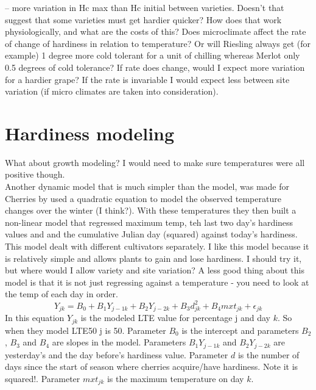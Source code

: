 \documentclass[11pt,letter]{article}
\begin{document}
\cite{Ferguson2014} – more variation in Hc max than Hc initial between varieties. Doesn't that suggest that some varieties must get hardier quicker? How does that work physiologically, and what are the costs of this? Does microclimate affect the rate of change of hardiness in relation to temperature? Or will Riesling always get (for example) 1 degree more cold tolerant for a unit of chilling whereas Merlot only 0.5 degrees of cold tolerance? If rate does change, would I expect more variation for a hardier grape? If the rate is invariable I would expect less between site variation (if micro climates are taken into consideration). \\

\section{Hardiness modeling}

What about growth modeling? I would need to make sure temperatures were all positive though. \\

Another dynamic model that is much simpler than the \cite{Ferguson2011} model, was made for Cherries by \cite{Salazar-Gutierrez2020} used a quadratic equation to model the observed temperature changes over the winter (I think?). With these temperatures they then built a non-linear model that regressed maximum temp, teh last two day's hardiness values and and the cumulative Julian day (squared) against today's hardiness. This model dealt with different cultivators separately. I like this model because it is relatively simple and allows plants to gain and lose hardiness. I should try it, but where would I allow variety and site variation? A less good thing about this model is that it is not just regressing against a temperature - you need to look at the temp of each day in order. 
\begin{equation*}
Y_{jk} = B_{0} + B_{1}Y_{j-1k} + B_{2}Y_{j-2k} + B_{3}d^{2}_{jk} + B_{4}mxt_{jk} + \epsilon_{jk} 
\end{equation*} 
In this equation $Y_{jk}$ is the modeled LTE value for percentage j and day $k$. So when they model LTE50 j is 50. Parameter $B_{0}$ is the intercept and parameters $B_{2}$, $B_{3}$ and $B_{4}$ are slopes in the model. Parameters $B_{1}Y_{j-1k}$ and $B_{2}Y_{j-2k}$ are yesterday's and the day before's hardiness value. Parameter $d$ is the number of days since the start of season where cherries acquire/have hardiness. Note it is squared!. Parameter $mxt_{jk}$ is the maximum temperature on day $k$. \\
\end{document}
